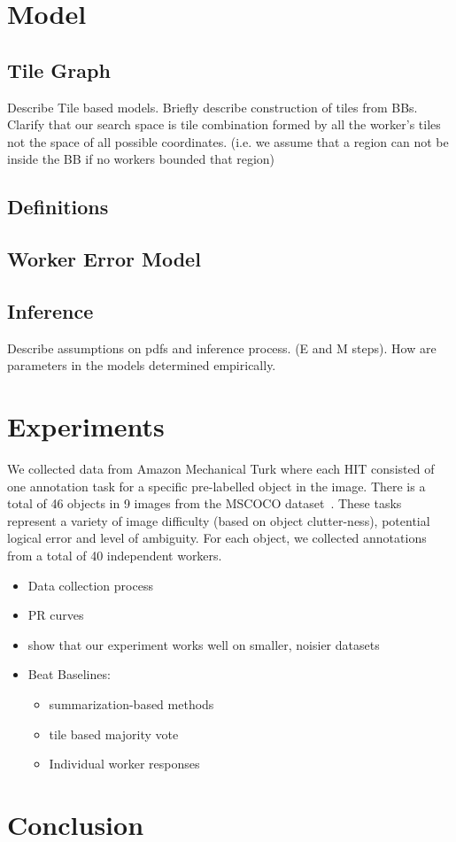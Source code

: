\documentclass[letterpaper]{article} %
\begin{document}
\section{Model}
\subsection{Tile Graph} Describe Tile based models. Briefly describe construction of tiles from BBs.
Clarify that our search space is tile combination formed by all the worker's tiles not the space of all possible coordinates. (i.e. we assume that a region can not be inside the BB if no workers bounded that region) 
\subsection{Definitions}
\subsection{Worker Error Model}
\subsection{Inference}
Describe assumptions on pdfs and inference process. (E and M steps). How are parameters in the models determined empirically.
\section{Experiments}
We collected data from Amazon Mechanical Turk where each HIT consisted of one annotation task for a specific pre-labelled object in the image. There is a total of 46 objects in 9 images from the MSCOCO dataset~\cite{Lin2014}. These tasks represent a variety of image difficulty (based on object clutter-ness), potential logical error and level of ambiguity.   For each object, we collected annotations from a total of 40 independent workers.
\begin{itemize}
\item Data collection process
\item PR curves
\item show that our experiment works well on smaller, noisier datasets
\item Beat Baselines: 
\begin{itemize}
\item summarization-based methods
\item tile based majority vote 
\item Individual worker responses
\end{itemize}
\end{itemize}
\section{Conclusion}


\end{document}
